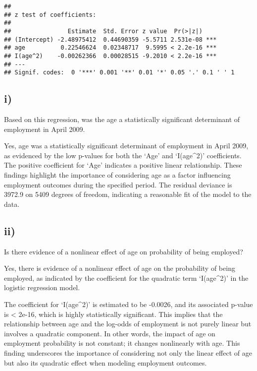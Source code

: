 \documentclass[
]{article}
\begin{document}
\begin{verbatim}
## 
## z test of coefficients:
## 
##                Estimate  Std. Error z value  Pr(>|z|)    
## (Intercept) -2.48975412  0.44690359 -5.5711 2.531e-08 ***
## age          0.22546624  0.02348717  9.5995 < 2.2e-16 ***
## I(age^2)    -0.00262366  0.00028515 -9.2010 < 2.2e-16 ***
## ---
## Signif. codes:  0 '***' 0.001 '**' 0.01 '*' 0.05 '.' 0.1 ' ' 1
\end{verbatim}

\hypertarget{i-2}{%
\subsection{i)}\label{i-2}}

Based on this regression, was the age a statistically significant
determinant of employment in April 2009. \vspace{1em}

Yes, age was a statistically significant determinant of employment in
April 2009, as evidenced by the low p-values for both the `Age' and
`I(age\^{}2)' coefficients. The positive coefficient for `Age' indicates
a positive linear relationship. These findings highlight the importance
of considering age as a factor influencing employment outcomes during
the specified period. The residual deviance is 3972.9 on 5409 degrees of
freedom, indicating a reasonable fit of the model to the data.

\hypertarget{ii-2}{%
\subsection{ii)}\label{ii-2}}

Is there evidence of a nonlinear effect of age on probability of being
employed? \vspace{1em}

Yes, there is evidence of a nonlinear effect of age on the probability
of being employed, as indicated by the coefficient for the quadratic
term `I(age\^{}2)' in the logistic regression model.

The coefficient for `I(age\^{}2)' is estimated to be -0.0026, and its
associated p-value is \textless{} 2e-16, which is highly statistically
significant. This implies that the relationship between age and the
log-odds of employment is not purely linear but involves a quadratic
component. In other words, the impact of age on employment probability
is not constant; it changes nonlinearly with age. This finding
underscores the importance of considering not only the linear effect of
age but also its quadratic effect when modeling employment outcomes.
\end{document}
